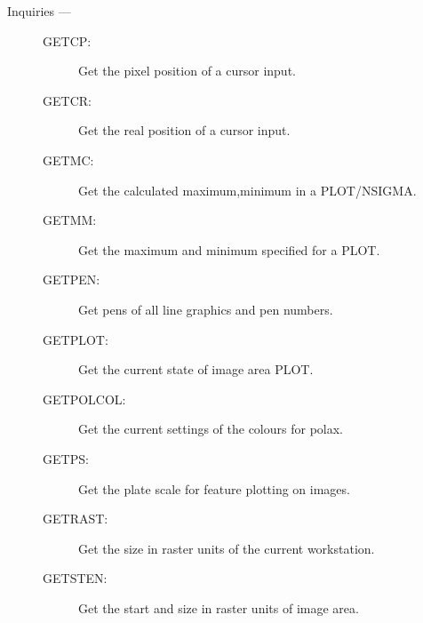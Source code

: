 \begin{description}
\item [Inquiries ---]
\begin{description}
\item [GETCP:]  Get the pixel position of a cursor input.
\item [GETCR:]  Get the real position of a cursor input.
\item [GETMC:]  Get the calculated maximum,minimum in a PLOT/NSIGMA.
\item [GETMM:]  Get the maximum and minimum specified for a PLOT.
\item [GETPEN:]  Get pens of all line graphics and pen numbers.
\item [GETPLOT:]  Get the current state of image area PLOT.
\item [GETPOLCOL:]  Get the current settings of the colours for polax.
\item [GETPS:]  Get the plate scale for feature plotting on images.
\item [GETRAST:]  Get the size in raster units of the current workstation.
\item [GETSTEN:]  Get the start and size in raster units of image area.
\end{description}


\end{description}
